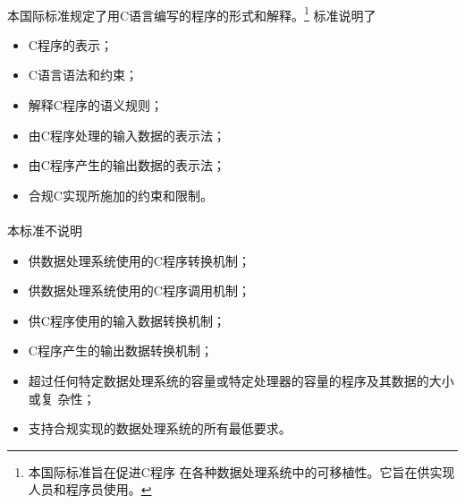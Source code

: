 
\paragraph{}
本国际标准规定了用C语言编写的程序的形式和解释。\footnote{本国际标准旨在促进C程序
在各种数据处理系统中的可移植性。它旨在供实现人员和程序员使用。} 标准说明了
\begin{itemize}
  \item{C程序的表示；}
  \item{C语言语法和约束；}
  \item{解释C程序的语义规则；}
  \item{由C程序处理的输入数据的表示法；}
  \item{由C程序产生的输出数据的表示法；}
  \item{合规C实现所施加的约束和限制。}
\end{itemize}

\paragraph{}
本标准不说明
\begin{itemize}
  \item{供数据处理系统使用的C程序转换机制；}
  \item{供数据处理系统使用的C程序调用机制；}
  \item{供C程序使用的输入数据转换机制；}
  \item{C程序产生的输出数据转换机制；}
  \item{超过任何特定数据处理系统的容量或特定处理器的容量的程序及其数据的大小或复
    杂性；}
  \item{支持合规实现的数据处理系统的所有最低要求。}
\end{itemize}
